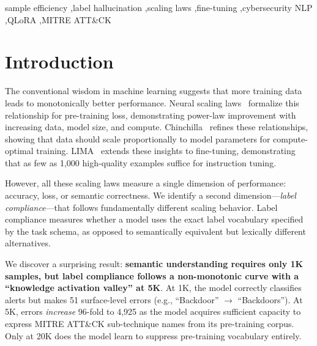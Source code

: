 \documentclass[review,3p]{elsarticle}
\begin{document}
\begin{frontmatter}
\begin{keyword}
sample efficiency \sep label hallucination \sep scaling laws \sep fine-tuning \sep cybersecurity NLP \sep QLoRA \sep MITRE ATT\&CK
\end{keyword}

\end{frontmatter}

\section{Introduction}

The conventional wisdom in machine learning suggests that more training data leads to monotonically better performance. Neural scaling laws~\cite{kaplan2020} formalize this relationship for pre-training loss, demonstrating power-law improvement with increasing data, model size, and compute. Chinchilla~\cite{hoffmann2022} refines these relationships, showing that data should scale proportionally to model parameters for compute-optimal training. LIMA~\cite{zhou2023} extends these insights to fine-tuning, demonstrating that as few as 1,000 high-quality examples suffice for instruction tuning.

However, all these scaling laws measure a single dimension of performance: accuracy, loss, or semantic correctness. We identify a second dimension---\emph{label compliance}---that follows fundamentally different scaling behavior. Label compliance measures whether a model uses the exact label vocabulary specified by the task schema, as opposed to semantically equivalent but lexically different alternatives.

We discover a surprising result: \textbf{semantic understanding requires only 1K samples, but label compliance follows a non-monotonic curve with a ``knowledge activation valley'' at 5K}. At 1K, the model correctly classifies alerts but makes 51 surface-level errors (e.g., ``Backdoor'' $\to$ ``Backdoors''). At 5K, errors \emph{increase} 96-fold to 4,925 as the model acquires sufficient capacity to express MITRE ATT\&CK sub-technique names from its pre-training corpus. Only at 20K does the model learn to suppress pre-training vocabulary entirely.
\end{document}
